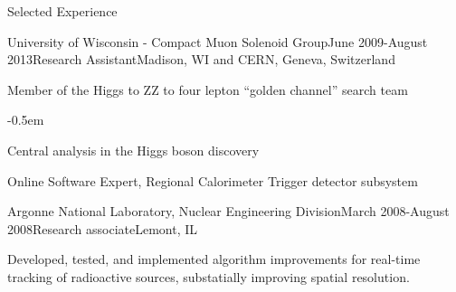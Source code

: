 \documentclass{resume} %
\begin{document}
\begin{rSection}{Selected Experience}
\begin{rSubsection}{University of Wisconsin - Compact Muon Solenoid Group}{June
2009-August 2013}{Research Assistant}{Madison, WI and CERN, Geneva, Switzerland}
\item Member of the Higgs to ZZ to four lepton ``golden channel'' search team
    \begin{list}{}{\leftmargin=1.5em} 
      \itemsep -0.5em \vspace{-0.5em} %
      \item Central analysis in the Higgs boson discovery
    \end{list}

\item Online Software Expert, Regional Calorimeter Trigger detector subsystem



\end{rSubsection}



\begin{rSubsection}{Argonne National Laboratory, Nuclear Engineering
Division}{March 2008-August 2008}{Research associate}{Lemont, IL}
\item Developed, tested, and implemented algorithm improvements for real-time
tracking of radioactive sources, substatially improving spatial resolution.
\end{rSubsection}


\end{rSection}
\end{document}
